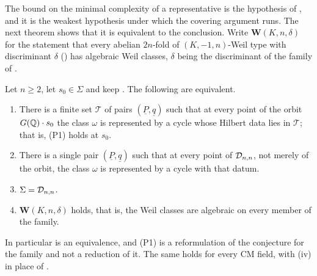 The bound on the minimal complexity of a representative is the hypothesis of
, and it is the weakest hypothesis under which the
covering argument runs. The next theorem shows that it is equivalent to the
conclusion. Write $\mathbf{W}(K,n,\delta)$ for the statement that every
abelian $2n$-fold of $(K,-1,n)$-Weil type with discriminant $\delta$
() has algebraic Weil classes, $\delta$ being the discriminant
of the family of .

\begin{theorem}\label{thm:p1equivalent}
Let $n\ge2$, let $s_{0}\in\Sigma$ and keep . The following
are equivalent.
\begin{enumerate}[label=\textup{(\alph*)},leftmargin=2.6em,itemsep=2pt]
\item There is a finite set $\mathcal{T}$ of pairs
  $(\underline{P},\underline{q})$ such that at every point of the orbit
  $G(\mathbb{Q})\cdot s_{0}$ the class $\omega$ is represented by a cycle whose
  Hilbert data lies in $\mathcal{T}$; that is, \textup{(P1)} holds at
  $s_{0}$.
\item There is a single pair $(\underline{P},\underline{q})$ such that at
  every point of $\mathcal{D}_{n,n}$, not merely of the orbit, the class $\omega$ is
  represented by a cycle with that datum.
\item $\Sigma=\mathcal{D}_{n,n}$.
\item $\mathbf{W}(K,n,\delta)$ holds, that is, the Weil classes are algebraic
  on every member of the family.
\end{enumerate}
In particular  is an equivalence, and \textup{(P1)} is a
reformulation of the conjecture for the family and not a reduction of it. The
same holds for every CM field, with (iv) in place of
.
\end{theorem}

